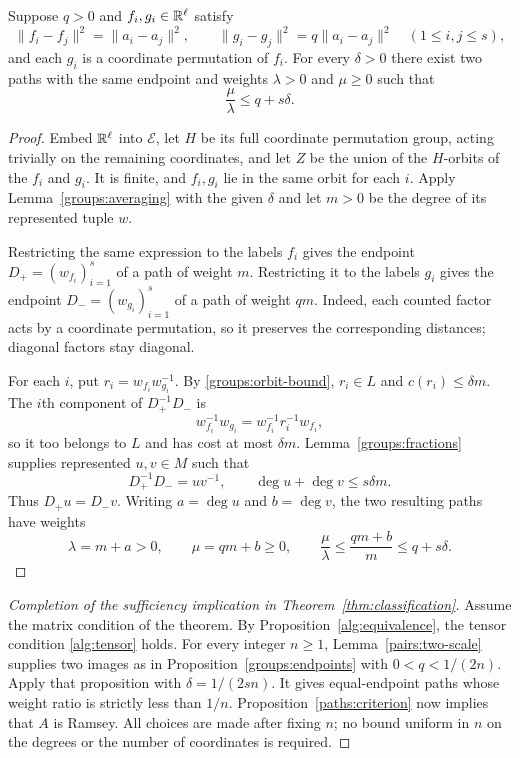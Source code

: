 \begin{proposition}\label{groups:endpoints}
Suppose $q>0$ and $f_i,g_i\in\mathbb R^\ell$ satisfy
\[
 \|f_i-f_j\|^2=\|a_i-a_j\|^2,\qquad
 \|g_i-g_j\|^2=q\|a_i-a_j\|^2
 \quad(1\le i,j\le s),
\]
and each $g_i$ is a coordinate permutation of $f_i$.
For every $\delta>0$ there exist two paths with the same endpoint and
weights $\lambda>0$ and $\mu\ge0$ such that
\[
 \frac{\mu}{\lambda}\le q+s\delta.
\]
\end{proposition}
\begin{proof}
Embed $\mathbb R^\ell$ into $\mathcal E$, let $H$ be its full coordinate
permutation group, acting trivially on the remaining coordinates, and
let $Z$ be the union of the $H$-orbits of the $f_i$ and $g_i$.
It is finite, and $f_i,g_i$ lie in the same orbit for each $i$.
Apply Lemma~\ref{groups:averaging} with the given $\delta$ and let $m>0$
be the degree of its represented tuple $w$.

Restricting the same expression to the labels $f_i$ gives the endpoint
$D_+=(w_{f_i})_{i=1}^s$ of a path of weight $m$.
Restricting it to the labels $g_i$ gives the endpoint
$D_-=(w_{g_i})_{i=1}^s$ of a path of weight $qm$.
Indeed, each counted factor acts by a coordinate permutation, so it
preserves the corresponding distances; diagonal factors stay diagonal.

For each $i$, put $r_i=w_{f_i}w_{g_i}^{-1}$.  By
\eqref{groups:orbit-bound}, $r_i\in L$ and $c(r_i)\le\delta m$.
The $i$th component of $D_+^{-1}D_-$ is
\[
 w_{f_i}^{-1}w_{g_i}=w_{f_i}^{-1}r_i^{-1}w_{f_i},
\]
so it too belongs to $L$ and has cost at most $\delta m$.
Lemma~\ref{groups:fractions} supplies represented $u,v\in M$ such that
\[
 D_+^{-1}D_-=uv^{-1},\qquad
 \deg u+\deg v\le s\delta m.
\]
Thus $D_+u=D_-v$.
Writing $a=\deg u$ and $b=\deg v$, the two resulting paths have weights
\[
 \lambda=m+a>0,\qquad \mu=qm+b\ge0,
 \qquad
 \frac{\mu}{\lambda}
    \le\frac{qm+b}{m}\le q+s\delta.
\]
\end{proof}

\begin{proof}[Completion of the sufficiency implication in
Theorem~\ref{thm:classification}]
Assume the matrix condition of the theorem. By
Proposition~\ref{alg:equivalence}, the tensor condition
\eqref{alg:tensor} holds.
For every integer $n\ge1$, Lemma~\ref{pairs:two-scale} supplies two
images as in Proposition~\ref{groups:endpoints} with
$0<q<1/(2n)$.  Apply that proposition with $\delta=1/(2sn)$.
It gives equal-endpoint paths whose weight ratio is strictly less than
$1/n$.  Proposition~\ref{paths:criterion} now implies that $A$ is Ramsey.
All choices are made after fixing $n$; no bound uniform in $n$ on the
degrees or the number of coordinates is required.
\end{proof}
